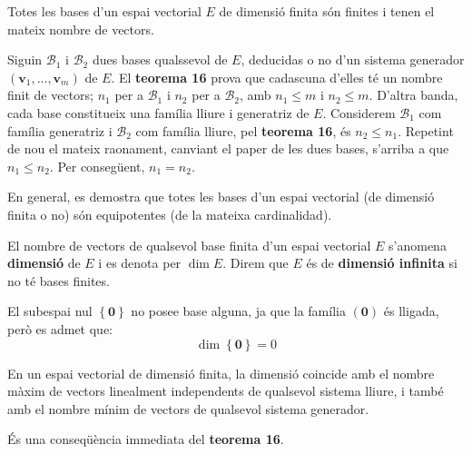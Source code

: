 \begin{teorema}
Totes les bases d’un espai vectorial $E$ de dimensió finita
són finites i tenen el mateix nombre de vectors.

\end{teorema}
\begin{prova}
Siguin $\mathcal{B}_{1}$ i $\mathcal{B}_{2}$ dues bases qualssevol de $%
E$, deducidas o no d’un sistema generador $(\mathbf{v}_{1},...,%
\mathbf{v}_{m})$ de $E$. El \textbf{teorema 16} prova que cadascuna
d'elles té un nombre finit de vectors; $n_{1}$ per a $\mathcal{B}%
_{1}$ i $n_{2}$ per a $\mathcal{B}_{2}$, amb $n_{1}\leq m$ i $n_{2}\leq m$.
D’altra banda, cada base constitueix una família lliure i generatriz de $%
E$. Considerem $\mathcal{B}_{1}$ com família generatriz i $%
\mathcal{B}_{2}$ com família lliure, pel \textbf{teorema 16}, és $%
n_{2}\leq n_{1}$. Repetint de nou el mateix raonament, canviant el
paper de les dues bases, s’arriba a que $n_{1}\leq n_{2}$. Per consegüent, $%
n_{1}=n_{2}$.
\end{prova}

\begin{observacio}
En general, es demostra que totes les bases d’un espai vectorial (de
dimensió finita o no) són equipotentes (de la mateixa cardinalidad).
\end{observacio}

\begin{definicio}
El nombre de vectors de qualsevol base finita d’un espai vectorial $%
E$ s’anomena \textbf{dimensió} de $E$ i es denota per $%
\dim E$. Direm que $E$ és de \textbf{dimensió
infinita} si no té bases finites.
\end{definicio}

\begin{observacio}
El subespai nul $\left\{ \mathbf{0}\right\} $ no posee base alguna, ja
que la família $\left( \mathbf{0}\right) $ és lligada, però es admet que: 
\begin{equation*}
\dim \left\{ \mathbf{0}\right\} =0
\end{equation*}
\end{observacio}

\begin{corollari}
En un espai vectorial de dimensió finita, la dimensió coincide
amb el nombre màxim de vectors linealment independents de
qualsevol sistema lliure, i també amb el nombre mínim de
vectors de qualsevol sistema generador.

\end{corollari}
\begin{prova}
És una conseqüència immediata del \textbf{teorema 16}.
\end{prova}

